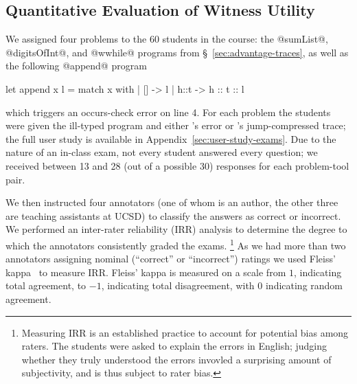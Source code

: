 \subsection{Quantitative Evaluation of Witness Utility}
\label{sec:user-study}
%
We assigned four problems to the 60 students in the course: the
@sumList@, \hbox{@digitsOfInt@,} and @wwhile@ programs from
\S~\ref{sec:advantage-traces}, as well as the following @append@ program
%
\begin{ecode}
  let append x l =
    match x with
    | []   -> l
    | h::t -> h :: t :: l
\end{ecode}
%
which triggers an occurs-check error on line 4.
%
For each problem the students were given the ill-typed program and
either \ocaml's error or \toolname's jump-compressed trace;
the full user study is available in Appendix~\ref{sec:user-study-exams}.
%
Due to the nature of an in-class exam, not every student answered every
question; we received between 13 and 28 (out of a possible 30) responses
for each problem-tool pair.

We then instructed four annotators (one of whom is an author, the other
three are teaching assistants at UCSD) to classify the answers as
correct or incorrect.
%
We performed an inter-rater reliability (IRR) analysis to determine the
degree to which the annotators consistently graded the exams.
\footnote{Measuring IRR is an established practice to account for
  potential bias among raters. The students were asked to explain the
  errors in English; judging whether they truly understood the errors
  invovled a surprising amount of subjectivity, and is thus subject to
  rater bias.}
%
As we had more than two annotators assigning nominal (``correct'' or
``incorrect'') ratings we used Fleiss' kappa~\cite{Fleiss1971-du} to
measure IRR.\@
%
Fleiss' kappa is measured on a scale from $1$, indicating total
agreement, to $-1$, indicating total disagreement, with $0$ indicating
random agreement.

